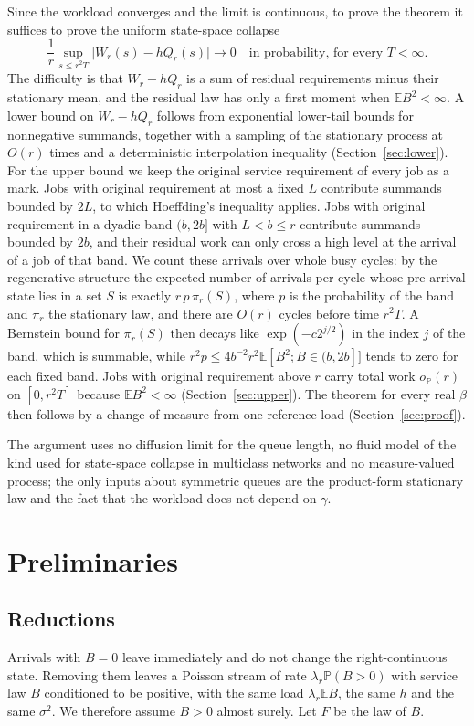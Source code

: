 \documentclass[11pt]{amsart}
\theoremstyle{remark}
\numberwithin{equation}{section}
\newcommand{\E}{\mathbb E}
\newcommand{\Pp}{\mathbb P}
\newcommand{\1}{\mathbf 1}
\begin{document}
Since the workload converges and the limit is continuous, to prove the theorem it suffices to prove the uniform state-space collapse
\begin{equation}\label{eq:collapse}
\frac1r\sup_{s\le r^2T}\bigl|W_r(s)-hQ_r(s)\bigr|\to0\quad\text{in probability, for every }T<\infty.
\end{equation}
The difficulty is that $W_r-hQ_r$ is a sum of residual requirements minus their stationary mean, and the residual law has only a first moment when $\E B^2<\infty$. A lower bound on $W_r-hQ_r$ follows from exponential lower-tail bounds for nonnegative summands, together with a sampling of the stationary process at $O(r)$ times and a deterministic interpolation inequality (Section~\ref{sec:lower}). For the upper bound we keep the original service requirement of every job as a mark. Jobs with original requirement at most a fixed $L$ contribute summands bounded by $2L$, to which Hoeffding's inequality applies. Jobs with original requirement in a dyadic band $(b,2b]$ with $L<b\le r$ contribute summands bounded by $2b$, and their residual work can only cross a high level at the arrival of a job of that band. We count these arrivals over whole busy cycles: by the regenerative structure the expected number of arrivals per cycle whose pre-arrival state lies in a set $S$ is exactly $r\,p\,\pi_r(S)$, where $p$ is the probability of the band and $\pi_r$ the stationary law, and there are $O(r)$ cycles before time $r^2T$. A Bernstein bound for $\pi_r(S)$ then decays like $\exp(-c2^{j/2})$ in the index $j$ of the band, which is summable, while $r^2p\le4b^{-2}r^2\E[B^2;B\in(b,2b]]$ tends to zero for each fixed band. Jobs with original requirement above $r$ carry total work $o_{\Pp}(r)$ on $[0,r^2T]$ because $\E B^2<\infty$ (Section~\ref{sec:upper}). The theorem for every real $\beta$ then follows by a change of measure from one reference load (Section~\ref{sec:proof}).

The argument uses no diffusion limit for the queue length, no fluid model of the kind used for state-space collapse in multiclass networks \cite{Bra,Wil} and no measure-valued process; the only inputs about symmetric queues are the product-form stationary law and the fact that the workload does not depend on $\gamma$.

\section{Preliminaries}\label{sec:prelim}

\subsection{Reductions}
Arrivals with $B=0$ leave immediately and do not change the right-continuous state. Removing them leaves a Poisson stream of rate $\lambda_r\Pp(B>0)$ with service law $B$ conditioned to be positive, with the same load $\lambda_r\E B$, the same $h$ and the same $\sigma^2$. We therefore assume $B>0$ almost surely. Let $F$ be the law of $B$.
\end{document}
